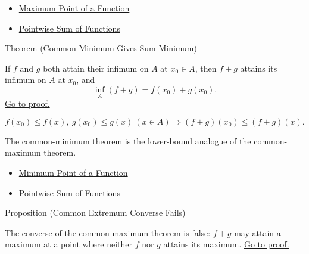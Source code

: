 \begin{dependencies}
\begin{itemize}
  \item \hyperref[def:function-maximum-point]{Maximum Point of a Function}
  \item \hyperref[def:pointwise-sum-of-functions]{Pointwise Sum of Functions}
\end{itemize}
\end{dependencies}

\begin{theorembox}{Theorem (Common Minimum Gives Sum Minimum)}
\begin{theorem}
\label{thm:common-minimum-gives-sum-minimum}
If \(f\) and \(g\) both attain their infimum on \(A\) at \(x_0\in A\), then
\(f+g\) attains its infimum on \(A\) at \(x_0\), and
\[
  \inf_A(f+g)=f(x_0)+g(x_0).
\]
\hyperref[prf:common-minimum-gives-sum-minimum]{Go to proof.}
\end{theorem}
\end{theorembox}

\begin{remark*}
\[
  f(x_0)\leq f(x),\ g(x_0)\leq g(x)\ (x\in A)
  \Rightarrow
  (f+g)(x_0)\leq (f+g)(x).
\]
\end{remark*}

\begin{remark*}[Interpretation]
The common-minimum theorem is the lower-bound analogue of the common-maximum
theorem.
\end{remark*}

\begin{dependencies}
\begin{itemize}
  \item \hyperref[def:function-minimum-point]{Minimum Point of a Function}
  \item \hyperref[def:pointwise-sum-of-functions]{Pointwise Sum of Functions}
\end{itemize}
\end{dependencies}

\begin{propositionbox}{Proposition (Common Extremum Converse Fails)}
\begin{proposition}
\label{prop:common-extremum-converse-fails}
The converse of the common maximum theorem is false: \(f+g\) may attain a
maximum at a point where neither \(f\) nor \(g\) attains its maximum.
\hyperref[prf:common-extremum-converse-fails]{Go to proof.}
\end{proposition}
\end{propositionbox}


